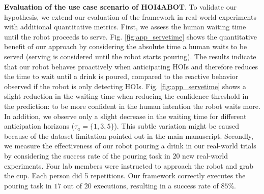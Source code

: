 \documentclass{article}
\begin{document}
\textbf{Evaluation of the use case scenario of HOI4ABOT}. 
To validate our hypothesis, we extend our evaluation of the framework in real-world experiments with additional quantitative metrics.  First, we assess the human waiting time until the robot proceeds to serve. Fig. \ref{fig:app_servetime} shows the quantitative benefit of our approach by considering the absolute time a human waits to be served (serving is considered until the robot starts pouring). The results indicate that our robot behaves proactively when anticipating HOIs and therefore reduces the time to wait until a drink is poured, compared to the reactive behavior observed if the robot is only detecting HOIs.  Fig. \ref{fig:app_servetime} shows a slight reduction in the waiting time when reducing the confidence threshold in the prediction: to be more confident in the human intention the robot waits more. In addition, we observe only a slight decrease in the waiting time for different anticipation horizons ($\tau_a=\{1,3,5\}$). This subtle variation might be caused because of the dataset limitation pointed out in the main manuscript. Secondly, we measure the effectiveness of our robot pouring a drink in our real-world trials by considering the success rate of the pouring task in $20$ new real-world experiments. Four lab members were instructed to approach the robot and grab the cup. Each person did 5 repetitions. Our framework correctly executes the pouring task in $17$ out of $20$ executions, resulting in a success rate of $85\%$. 
\end{document}

